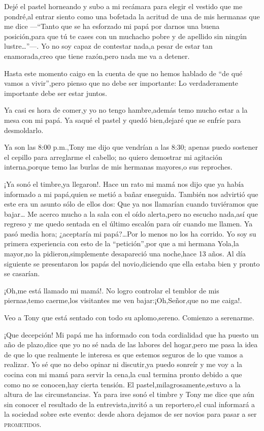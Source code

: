 \documentclass[letterpaper,12pt]{book}
\begin{document}
Dejé el pastel horneando y subo a mi recámara para elegir el vestido que me pondré,al entrar siento como una bofetada la acritud de una de mis hermanas que me dice ---``Tanto que se ha esforzado mi papá por darnos una buena posición,para que tú te cases con un muchacho pobre y de apellido sin ningún lustre\ldots''---. Yo no soy capaz de contestar nada,a pesar de estar tan enamorada,creo que tiene razón,pero nada me va a detener. 
 
Hasta este momento caigo en la cuenta de que no hemos hablado de ``de qué vamos a vivir'',pero pienso que no debe ser importante: Lo verdaderamente importante debe ser estar juntos.

Ya casi es hora de comer,y yo no tengo hambre,además temo mucho estar a la mesa con mi papá. Ya saqué el pastel y quedó bien,dejaré que se enfríe para desmoldarlo.

Ya son las 8:00 p.m.,Tony me dijo que vendrían a las 8:30; apenas puedo sostener el cepillo para arreglarme el cabello; no quiero demostrar mi agitación interna,porque temo las burlas de mis hermanas mayores,o sus reproches.

¡Ya sonó el timbre,ya llegaron!. Hace un rato mi mamá nos dijo que ya había informado a mi papá,quien se metió a bañar enseguida. También nos advirtió que este era un asunto sólo de ellos dos: Que ya nos llamarían cuando tuviéramos que bajar\ldots
Me acerco mucho a la sala con el oído alerta,pero no escucho nada,así que regreso y me quedo sentada en el último escalón para oír cuando me llamen. Ya pasó media hora; ¿aceptaría mi papá?\ldots Por lo menos no los ha corrido. Yo soy su primera experiencia con esto de la ``petición'',por que a mi hermana Yola,la mayor,no la pidieron,simplemente desapareció una noche,hace 13 años.  Al día siguiente se presentaron los papás del novio,diciendo que ella estaba bien y pronto se casarían.

¡Oh,me está llamado mi mamá!. No logro controlar el temblor de mis piernas,temo caerme,los visitantes me ven bajar:¡Oh,Señor,que no me caiga!.

Veo a Tony que está sentado con todo su aplomo,sereno. Comienzo a serenarme.

¡Que decepción! Mi papá me ha informado con toda cordialidad que ha puesto un año de plazo,dice que yo no sé nada de las labores del hogar,pero me pasa la idea de que lo que realmente le interesa es que estemos seguros de lo que vamos a realizar. Yo sé que no debo opinar ni discutir,ya puedo sonreír y me voy a la cocina con mi mamá para servir la cena,la cual termina pronto debido a que como no se conocen,hay cierta tensión. El pastel,milagrosamente,estuvo a la altura de las circunstancias. Ya para irse sonó el timbre y Tony me dice que aún sin conocer el resultado de la entrevista,invitó a un reportero,el cual informará a la sociedad sobre este evento: desde ahora dejamos de ser novios para pasar a ser \textsc{prometidos}.
\end{document}
